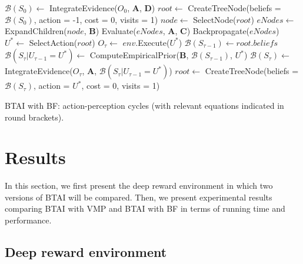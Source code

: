 \documentclass[twoside,11pt]{article}
\begin{document}
\begin{algorithm}[H]
\label{algo:BTAI_BF_cycles}
\SetAlgoLined\DontPrintSemicolon
{}
\SetAlgoLined
{}
 $\mathcal{B}(S_0) \leftarrow $ IntegrateEvidence($O_0$, $\bm{A}$, $\bm{D}$) 
 $root \leftarrow $ CreateTreeNode(beliefs = $\mathcal{B}(S_0)$, action = -1, cost = 0, visits = 1)
  {
  {
   $node \leftarrow $ SelectNode($root$) 
   $eNodes \leftarrow $ ExpandChildren($node$, $\bm{B}$) 
   Evaluate($eNodes$, $\bm{A}$, $\bm{C}$) 
   Backpropagate($eNodes$) 
 }
 $U^* \leftarrow $ SelectAction($root$) 
 $O_\tau \leftarrow $ $env$.Execute($U^*$)\;
 $\mathcal{B}(S_{\tau-1}) \leftarrow root.beliefs$ 
 $\mathcal{B}(S_\tau|U_{\tau-1} = U^*) \leftarrow $ ComputeEmpiricalPrior($\bm{B}$, $\mathcal{B}(S_{\tau-1})$, $U^*$) 
 $\mathcal{B}(S_\tau) \leftarrow $ IntegrateEvidence($O_\tau$, $\bm{A}$, $\mathcal{B}(S_\tau|U_{\tau-1} = U^*)$) 
 $root \leftarrow $ CreateTreeNode(beliefs = $\mathcal{B}(S_\tau)$, action = $U^*$, cost = 0, visits = 1)\;
 }
 \caption{BTAI with BF: action-perception cycles (with relevant equations indicated in round brackets).}
\end{algorithm}

\section{Results} \label{sec:results}

In this section, we first present the deep reward environment in which two versions of BTAI will be compared. Then, we present experimental results comparing BTAI with VMP and BTAI with BF in terms of running time and performance.

\subsection{Deep reward environment}
\end{document}
